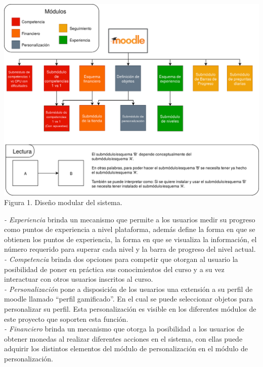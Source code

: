         \begin{center}
        \includegraphics[width=1\linewidth]{images/modulos}
        \small Figura 1. Diseño modular del sistema.
        \end{center}
%
    {\it - Experiencia} brinda un mecanismo que permite a los usuarios medir su
    progreso como puntos de experiencia a nivel plataforma, además define la forma
    en que se obtienen los puntos de experiencia, la forma en que se visualiza la
    información, el número requerido para superar cada nivel y la barra de progreso
    del nivel actual.\\

    {\it - Competencia} brinda dos opciones para competir que otorgan al usuario
    la posibilidad de poner en práctica sus conocimientos del curso y a su vez
    interactuar con otros usuarios inscritos al curso.\\

    {\it - Personalización} pone a disposición de los usuarios una extensión a su
    perfil de moodle llamado ``perfil gamificado''. En el cual se puede seleccionar
    objetos para personalizar su perfil. Esta personalización es visible en los
    diferentes módulos de este proyecto que soporten esta función.\\

    {\it - Financiero} brinda un mecanismo que otorga la posibilidad a los usuarios
    de obtener monedas al realizar diferentes acciones en el sistema, con ellas puede
    adquirir los distintos elementos del módulo de personalización en el módulo
    de personalización.\\

